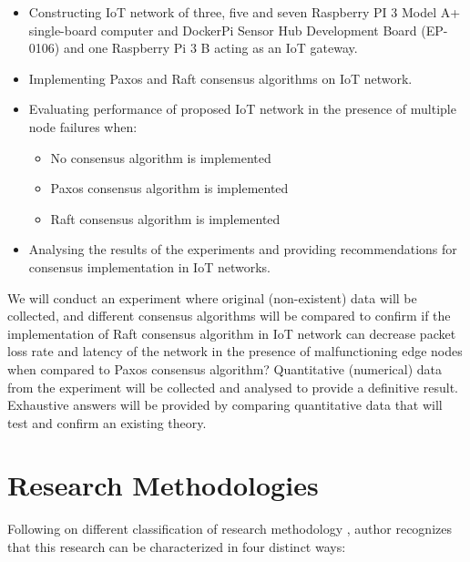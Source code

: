 \documentclass[oneside,12pt]{book}
\begin{document}
\begin{itemize}
  \item Constructing IoT network of three, five and seven Raspberry PI 3 Model A+ single-board computer and DockerPi Sensor Hub Development Board (EP-0106) and one Raspberry Pi 3 B acting as an IoT gateway.
  
  \item Implementing Paxos and Raft consensus algorithms on IoT network.
  
   \item Evaluating performance of proposed IoT network in the presence of multiple node failures when:
   \begin{itemize}
   
        \item No consensus algorithm is implemented
  
        \item Paxos consensus algorithm is implemented
  
        \item Raft consensus algorithm is implemented
   
   \end{itemize}
   \item Analysing the results of the experiments and providing recommendations for consensus implementation in IoT networks. 
   
\end{itemize}
We will conduct an experiment where original (non-existent) data will be collected, and different consensus algorithms will be compared to confirm if the implementation of Raft consensus algorithm in IoT network can decrease packet loss rate and latency of the network in the presence of malfunctioning edge nodes when compared to Paxos consensus algorithm?\smallskip \newline
Quantitative (numerical) data from the experiment will be collected and analysed to provide a definitive result. Exhaustive answers will be provided by comparing quantitative data that will test and confirm an existing theory.

\section{Research Methodologies}
Following on different classification of research methodology \citep{WOHLIN2021106678}, author recognizes that this research can be characterized in four distinct ways:
\end{document}
